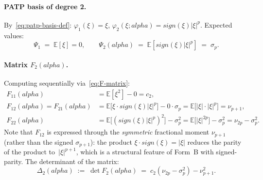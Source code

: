 \documentclass[11pt]{article}
\def\alpha{alpha}%
\def\mathbf#1{#1}%
\def\mathrm#1{#1}%
\theoremstyle{definition}
\newcommand{\E}{\mathbb{E}}
\begin{document}
\paragraph{PATP basis of degree 2.}
By~\eqref{eq:patp-basis-def}: $\varphi_1(\xi) = \xi$,
$\varphi_2(\xi; \alpha) = \mathrm{sign}(\xi) |\xi|^{p}$. Expected values:
\begin{equation}\label{eq:psi-1-2}
  \Psi_1 \;=\; \E[\xi] = 0,
  \qquad
  \Psi_2(\alpha) \;=\; \E[\mathrm{sign}(\xi)|\xi|^p] \;=\; \sigma_p.
\end{equation}

\paragraph{Matrix $\mathbf{F}_2(\alpha)$.}
Computing sequentially via~\eqref{eq:F-matrix}:
\begin{align}
  F_{11}(\alpha)
    &= \E[\xi^2] - 0
     = c_2,
  \label{eq:F11-patp}\\
  F_{12}(\alpha) = F_{21}(\alpha)
    &= \E\bigl[\xi \cdot \mathrm{sign}(\xi)|\xi|^p\bigr] - 0 \cdot \sigma_p
     = \E\bigl[|\xi| \cdot |\xi|^p\bigr]
     = \nu_{p+1},
  \label{eq:F12-patp}\\
  F_{22}(\alpha)
    &= \E\bigl[(\mathrm{sign}(\xi)|\xi|^p)^2\bigr] - \sigma_p^2
     = \E\bigl[|\xi|^{2p}\bigr] - \sigma_p^2
     = \nu_{2p} - \sigma_p^2.
  \label{eq:F22-patp}
\end{align}
Note that $F_{12}$ is expressed through the \emph{symmetric} fractional
moment $\nu_{p+1}$ (rather than the signed $\sigma_{p+1}$): the product
$\xi \cdot \mathrm{sign}(\xi) = |\xi|$ reduces the parity of the product
to~$|\xi|^{p+1}$, which is a structural feature of Form~B with
signed-parity. The determinant of the matrix:
\begin{equation}\label{eq:detF-patp}
  \Delta_2(\alpha)
  \;:=\; \det \mathbf{F}_2(\alpha)
  \;=\; c_2(\nu_{2p} - \sigma_p^2) - \nu_{p+1}^2.
\end{equation}
\end{document}
